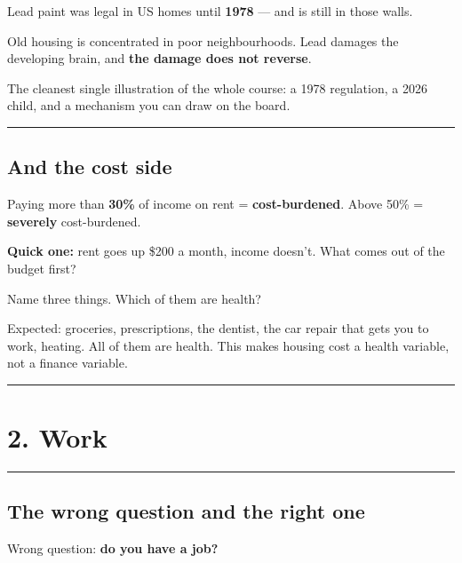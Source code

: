 \documentclass[
  letterpaper,
  DIV=11,
  numbers=noendperiod]{scrartcl}
\begin{document}
Lead paint was legal in US homes until \textbf{1978} --- and is still in
those walls.

Old housing is concentrated in poor neighbourhoods. Lead damages the
developing brain, and \textbf{the damage does not reverse}.

The cleanest single illustration of the whole course: a 1978 regulation,
a 2026 child, and a mechanism you can draw on the board.

\begin{center}\rule{0.5\linewidth}{0.5pt}\end{center}

\subsection{\texorpdfstring{{\textbf{And the cost
side}}}{And the cost side}}\label{and-the-cost-side}

Paying more than \textbf{30\%} of income on rent =
\textbf{cost-burdened}. Above 50\% = \textbf{severely} cost-burdened.

\textbf{Quick one:} rent goes up \$200 a month, income doesn't. What
comes out of the budget first?

Name three things. Which of them are health?

Expected: groceries, prescriptions, the dentist, the car repair that
gets you to work, heating. All of them are health. This makes housing
cost a health variable, not a finance variable.

\begin{center}\rule{0.5\linewidth}{0.5pt}\end{center}

\section{\texorpdfstring{{\textbf{2. Work}}}{2. Work}}\label{work-1}

\begin{center}\rule{0.5\linewidth}{0.5pt}\end{center}

\subsection{\texorpdfstring{{\textbf{The wrong question and the right
one}}}{The wrong question and the right one}}\label{the-wrong-question-and-the-right-one}

Wrong question: \textbf{do you have a job?}
\end{document}
